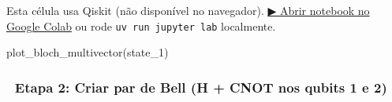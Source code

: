 \documentclass[
  brazilian,
]{report}
\newenvironment{Shaded}{\begin{snugshade}}{\end{snugshade}}
\newcommand{\NormalTok}[1]{\textcolor[rgb]{0.00,0.23,0.31}{#1}}
\begin{document}
\begin{tcolorbox}[enhanced jigsaw, arc=.35mm, bottomrule=.15mm, bottomtitle=1mm, breakable, colback=white, colbacktitle=quarto-callout-warning-color!10!white, colframe=quarto-callout-warning-color-frame, coltitle=black, left=2mm, leftrule=.75mm, opacityback=0, opacitybacktitle=0.6, rightrule=.15mm, title=\textcolor{quarto-callout-warning-color}{\faExclamationTriangle}\hspace{0.5em}{⚛️ Célula Qiskit --- execute no Colab ou localmente}, titlerule=0mm, toprule=.15mm, toptitle=1mm]

Esta célula usa Qiskit (não disponível no navegador).
\href{https://colab.research.google.com/github/maxwellamaral/aula-quantum/blob/main/notebooks/02-teletransport.ipynb}{▶
Abrir notebook no Google Colab} ou rode \texttt{uv\ run\ jupyter\ lab}
localmente.

\begin{Shaded}
\begin{Highlighting}[]

\NormalTok{plot\_bloch\_multivector(state\_1)}
\end{Highlighting}
\end{Shaded}

\end{tcolorbox}

\subsubsection{🔹 Etapa 2: Criar par de Bell (H + CNOT nos qubits 1 e
2)}\label{etapa-2-criar-par-de-bell-h-cnot-nos-qubits-1-e-2}
\end{document}

